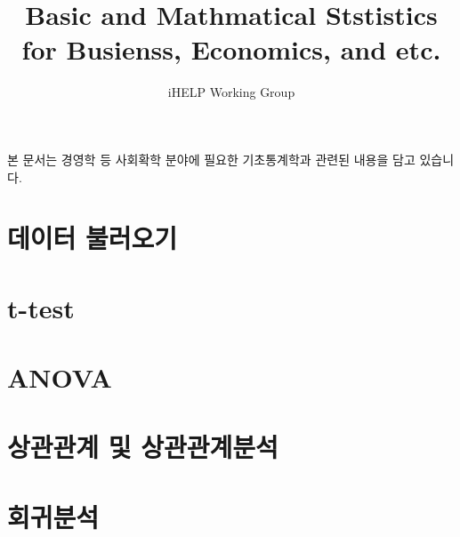 \documentclass{article}
\begin{document}
\title{Basic and Mathmatical Ststistics for Busienss, Economics, and etc.}
\author{iHELP Working Group}

본 문서는 경영학 등 사회확학 분야에 필요한 기초통계학과 관련된 내용을 담고 있습니다.

\chapter{데이터 불러오기}


\chapter{t-test}


\chapter{ANOVA}


\chapter{상관관계 및 상관관계분석}


\chapter{회귀분석}

\end{document}

